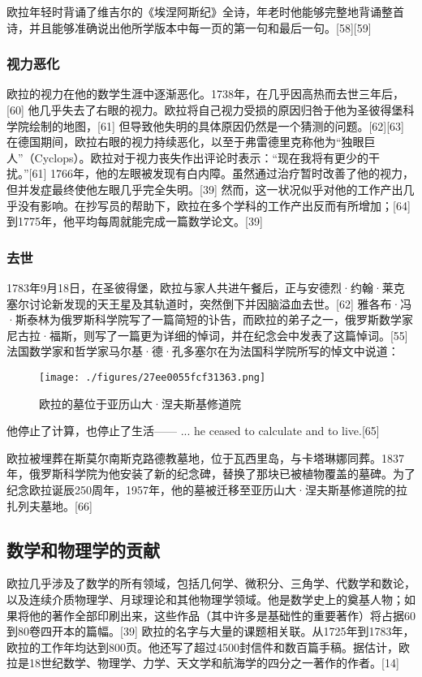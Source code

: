 欧拉年轻时背诵了维吉尔的《埃涅阿斯纪》全诗，年老时他能够完整地背诵整首诗，并且能够准确说出他所学版本中每一页的第一句和最后一句。[58][59]
\subsubsection{视力恶化}  
欧拉的视力在他的数学生涯中逐渐恶化。1738年，在几乎因高热而去世三年后，[60] 他几乎失去了右眼的视力。欧拉将自己视力受损的原因归咎于他为圣彼得堡科学院绘制的地图，[61] 但导致他失明的具体原因仍然是一个猜测的问题。[62][63] 在德国期间，欧拉右眼的视力持续恶化，以至于弗雷德里克称他为“独眼巨人”（Cyclops）。欧拉对于视力丧失作出评论时表示：“现在我将有更少的干扰。”[61] 1766年，他的左眼被发现有白内障。虽然通过治疗暂时改善了他的视力，但并发症最终使他左眼几乎完全失明。[39] 然而，这一状况似乎对他的工作产出几乎没有影响。在抄写员的帮助下，欧拉在多个学科的工作产出反而有所增加；[64] 到1775年，他平均每周就能完成一篇数学论文。[39]
\subsubsection{去世}  
1783年9月18日，在圣彼得堡，欧拉与家人共进午餐后，正与安德烈·约翰·莱克塞尔讨论新发现的天王星及其轨道时，突然倒下并因脑溢血去世。[62] 雅各布·冯·斯泰林为俄罗斯科学院写了一篇简短的讣告，而欧拉的弟子之一，俄罗斯数学家尼古拉·福斯，则写了一篇更为详细的悼词，并在纪念会中发表了这篇悼词。[55] 法国数学家和哲学家马尔基·德·孔多塞尔在为法国科学院所写的悼文中说道：
\begin{figure}[ht]
\centering
\texttt{[image: ./figures/27ee0055fcf31363.png]}
\caption{欧拉的墓位于亚历山大·涅夫斯基修道院} \label{fig_OL1_2}
\end{figure}
他停止了计算，也停止了生活—— ... he ceased to calculate and to live.[65]

欧拉被埋葬在斯莫尔南斯克路德教墓地，位于瓦西里岛，与卡塔琳娜同葬。1837年，俄罗斯科学院为他安装了新的纪念碑，替换了那块已被植物覆盖的墓碑。为了纪念欧拉诞辰250周年，1957年，他的墓被迁移至亚历山大·涅夫斯基修道院的拉扎列夫墓地。[66]
\subsection{数学和物理学的贡献}
欧拉几乎涉及了数学的所有领域，包括几何学、微积分、三角学、代数学和数论，以及连续介质物理学、月球理论和其他物理学领域。他是数学史上的奠基人物；如果将他的著作全部印刷出来，这些作品（其中许多是基础性的重要著作）将占据60到80卷四开本的篇幅。[39] 欧拉的名字与大量的课题相关联。从1725年到1783年，欧拉的工作年均达到800页。他还写了超过4500封信件和数百篇手稿。据估计，欧拉是18世纪数学、物理学、力学、天文学和航海学的四分之一著作的作者。[14]

